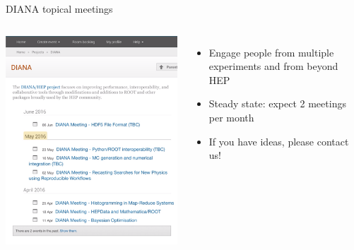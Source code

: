 \documentclass{beamer}
\begin{document}
\begin{frame}{DIANA topical meetings}
\begin{columns}
\includegraphics[width=\linewidth]{topical_meetings.png}

\begin{itemize}\setlength{\itemsep}{0.3 cm}
\item Engage people from multiple experiments and from beyond HEP
\item Steady state: expect 2 meetings per month
\item If you have ideas, please contact us!
\end{itemize}
\end{columns}
\end{frame}
\end{document}
